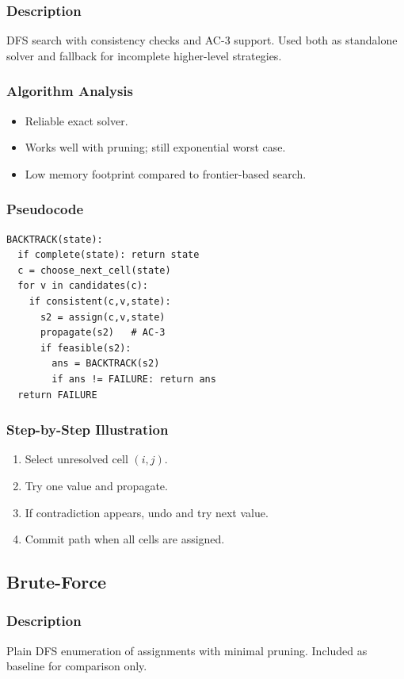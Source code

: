 \documentclass[12pt,a4paper]{article}
\begin{document}
\subsubsection{Description}
DFS search with consistency checks and AC-3 support.
Used both as standalone solver and fallback for incomplete higher-level strategies.

\subsubsection{Algorithm Analysis}
\begin{itemize}
    \item Reliable exact solver.
    \item Works well with pruning; still exponential worst case.
    \item Low memory footprint compared to frontier-based search.
\end{itemize}

\subsubsection{Pseudocode}
\begin{lstlisting}[style=pseudostyle, caption={Backtracking + AC-3}]
BACKTRACK(state):
  if complete(state): return state
  c = choose_next_cell(state)
  for v in candidates(c):
    if consistent(c,v,state):
      s2 = assign(c,v,state)
      propagate(s2)   # AC-3
      if feasible(s2):
        ans = BACKTRACK(s2)
        if ans != FAILURE: return ans
  return FAILURE
\end{lstlisting}

\subsubsection{Step-by-Step Illustration}
\begin{enumerate}
    \item Select unresolved cell $(i,j)$.
    \item Try one value and propagate.
    \item If contradiction appears, undo and try next value.
    \item Commit path when all cells are assigned.
\end{enumerate}

\subsection{Brute-Force}
\subsubsection{Description}
Plain DFS enumeration of assignments with minimal pruning.
Included as baseline for comparison only.
\end{document}
